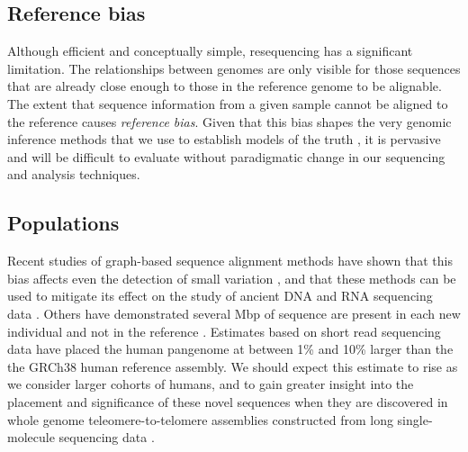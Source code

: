 \subsection{Reference bias}

Although efficient and conceptually simple, resequencing has a significant limitation.
The relationships between genomes are only visible for those sequences that are already close enough to those in the reference genome to be alignable.
The extent that sequence information from a given sample cannot be aligned to the reference causes \emph{reference bias}.
Given that this bias shapes the very genomic inference methods that we use to establish models of the truth \cite{zook2014integrating}, it is pervasive and will be difficult to evaluate without paradigmatic change in our sequencing and analysis techniques.

\subsection{Populations}

Recent studies of graph-based sequence alignment methods have shown that this bias affects even the detection of small variation \cite{eggertsson2017graphtyper,Garrison_2018}, and that these methods can be used to mitigate its effect on the study of ancient DNA \cite{martiniano2019removing} and RNA sequencing data \cite{Kim_2019}.
Others have demonstrated several Mbp of sequence are present in each new individual and not in the reference \cite{li2010building,Steinberg_2016,Audano_2019}.
Estimates based on short read sequencing data have placed the human pangenome at between 1\% \cite{li2010building} and 10\% \cite{sherman2019assembly} larger than the the GRCh38 human reference assembly.
We should expect this estimate to rise as we consider larger cohorts of humans, and to gain greater insight into the placement and significance of these novel sequences when they are discovered in whole genome teleomere-to-telomere assemblies constructed from long single-molecule sequencing data \cite{miga2019telomere,Langley_2019}.


